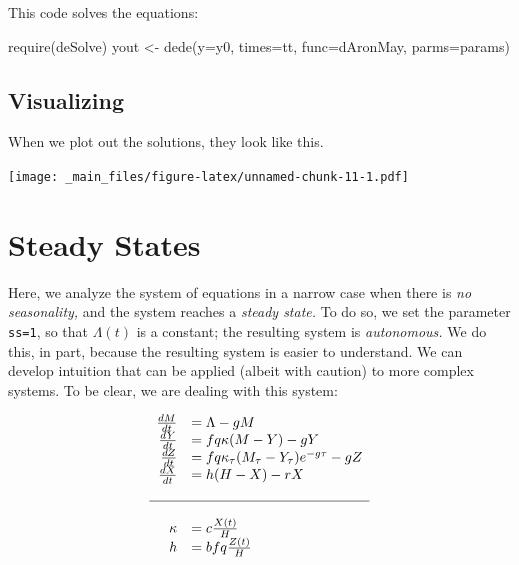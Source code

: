 \documentclass[
]{book}
\newenvironment{Shaded}{\begin{snugshade}}{\end{snugshade}}
\newcommand{\AttributeTok}[1]{\textcolor[rgb]{0.77,0.63,0.00}{#1}}
\newcommand{\FunctionTok}[1]{\textcolor[rgb]{0.00,0.00,0.00}{#1}}
\newcommand{\NormalTok}[1]{#1}
\newcommand{\OtherTok}[1]{\textcolor[rgb]{0.56,0.35,0.01}{#1}}
\begin{document}
This code solves the equations:

\begin{Shaded}
\begin{Highlighting}[]
\FunctionTok{require}\NormalTok{(deSolve)}
\NormalTok{yout }\OtherTok{\textless{}{-}} \FunctionTok{dede}\NormalTok{(}\AttributeTok{y=}\NormalTok{y0, }\AttributeTok{times=}\NormalTok{tt, }\AttributeTok{func=}\NormalTok{dAronMay, }\AttributeTok{parms=}\NormalTok{params) }
\end{Highlighting}
\end{Shaded}

\hypertarget{visualizing}{%
\subsection{Visualizing}\label{visualizing}}

When we plot out the solutions, they look like this.

\texttt{[image: \_main\_files/figure-latex/unnamed-chunk-11-1.pdf]}

\clearpage

\hypertarget{steady-states}{%
\section{Steady States}\label{steady-states}}

Here, we analyze the system of equations in a narrow case when there is \emph{no seasonality,} and the system reaches a \emph{steady state.} To do so, we set the parameter \texttt{ss=1}, so that \(\Lambda(t)\) is a constant; the resulting system is \emph{autonomous.} We do this, in part, because the resulting system is easier to understand. We can develop intuition that can be applied (albeit with caution) to more complex systems. To be clear, we are dealing with this system:

\begin{equation}
\begin{array}{rl}
\frac{dM}{dt} &= \Lambda - g M \\
\frac{dY}{dt} &= fq\kappa(M-Y) - g Y \\
\frac{dZ}{dt} &= fq\kappa_\tau(M_\tau-Y_\tau)e^{-g\tau} - g Z \\
\frac{dX}{dt} &= h (H-X) - rX  \\ \\ \hline \\ 
\kappa &= c \frac{X(t)}{H} \\
h &= b fq \frac{Z(t)}{H} \\
\end{array}
\end{equation}
\end{document}

